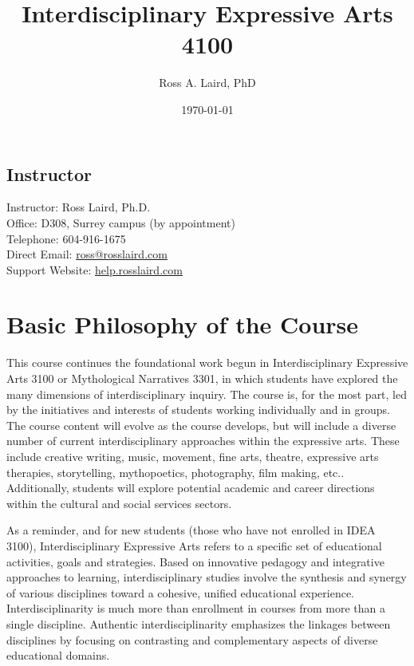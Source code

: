 \documentclass[letterpaper,10pt,headsepline]{scrreprt}
\author{Ross A. Laird, PhD}
\title{Interdisciplinary Expressive Arts 4100}
\date{\today}
\begin{document}
\begin{titlingpage}
\begin{center}
\maketitle
\end{center}
\end{titlingpage}
\tableofcontents
\subsection{Instructor}
Instructor: Ross Laird, Ph.D.\\ 
Office: D308, Surrey campus (by appointment)\\
Telephone: 604-916-1675\\
Direct Email: \url{ross@rosslaird.com}\\
Support Website: \url{help.rosslaird.com}\\

\section{Basic Philosophy of the Course}

This course continues the foundational work begun in Interdisciplinary Expressive Arts 3100 or Mythological Narratives 3301, in which students have explored the many dimensions of interdisciplinary inquiry. The course is, for the most part, led by the initiatives and interests of students working individually and in groups. The course content will evolve as the course develops, but will include a diverse number of current interdisciplinary approaches within the expressive arts. These include creative writing, music, movement, fine arts, theatre, expressive arts therapies, storytelling, mythopoetics, photography, film making, etc.. Additionally, students will explore potential academic and career directions within the cultural and social services sectors.

As a reminder, and for new students (those who have not enrolled in IDEA 3100), Interdisciplinary Expressive Arts refers to a specific set of educational activities, goals and strategies. Based on innovative pedagogy and integrative approaches to learning, interdisciplinary
studies involve the synthesis and synergy of various disciplines
toward a cohesive, unified educational experience. Interdisciplinarity
is much more than enrollment in courses from more than a single
discipline. Authentic interdisciplinarity emphasizes the linkages
between disciplines by focusing on contrasting and complementary
aspects of diverse educational domains.
\end{document}

